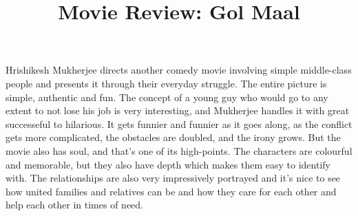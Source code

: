 \documentclass[12pt, a4paper]{article}
\title{Movie Review: Gol Maal}
\author{}
\date{}
\begin{document}
\maketitle
Hrishikesh Mukherjee directs another comedy movie involving simple middle-class people and presents it through their everyday struggle. The entire picture is simple, authentic and fun. The concept of a young guy who would go to any extent to not lose his job is very interesting, and Mukherjee handles it with great successeful to hilarious. It gets funnier and funnier as it goes along, as the conflict gets more complicated, the obstacles are doubled, and the irony grows. But the movie also has soul, and that's one of its high-points. The characters are colourful and memorable, but they also have depth which makes them easy to identify with. The relationships are also very impressively portrayed and it's nice to see how united families and relatives can be and how they care for each other and help each other in times of need.
\end{document}
